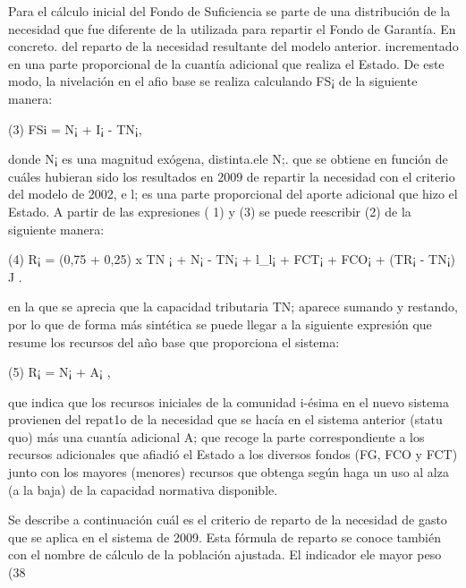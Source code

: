 \documentclass[10pt,a4paper]{article}
\begin{document}
Para el cálculo inicial del Fondo de Suficiencia se parte de una distribución de la necesidad que fue diferente de la utilizada para repartir el Fondo de Garantía. En concreto. del reparto de la necesidad resultante del modelo anterior. incrementado en una parte proporcional de la cuantía adicional que realiza el Estado. De este modo, la nivelación en el afio base se realiza calculando FS¡ de la siguiente manera:

(3) FSi = N¡ + I¡ - TN¡,

donde N¡ es una magnitud exógena, distinta.ele N;. que se obtiene en función de cuáles hubieran sido los resultados en 2009 de repartir la necesidad con el criterio del modelo de 2002, e l; es una parte proporcional del aporte adicional que hizo el Estado. A partir de las expresiones ( 1) y (3) se puede reescribir (2) de la siguiente manera:

(4) R¡ = (0,75 + 0,25) x TN ¡ + N¡ - TN¡ + l_l¡ + FCT¡ + FCO¡ + (TR¡ - TN¡) J .

en la que se aprecia que la capacidad tributaria TN; aparece sumando y restando, por lo que de forma más sintética se puede llegar a la siguiente expresión que resume los recursos del año base que proporciona el sistema:

(5) R¡ = N¡ + A¡ ,

que indica que los recursos iniciales de la comunidad i-ésima en el nuevo sistema provienen del repat1o de la necesidad que se hacía en el sistema anterior (statu quo) más una cuantía adicional A; que recoge la parte correspondiente a los recursos adicionales que afiadió el Estado a los diversos fondos (FG, FCO y FCT) junto con los mayores (menores) recursos que obtenga según haga un uso al alza (a la baja) de la capacidad normativa disponible.

Se describe a continuación cuál es el criterio de reparto de la necesidad de gasto que se aplica en el sistema de 2009. Esta fórmula de reparto se conoce también con el nombre de cálculo de la población ajustada. El indicador ele mayor peso (38%
\end{document}
